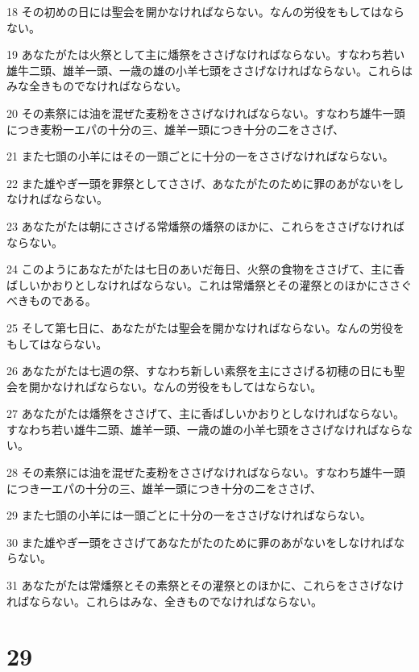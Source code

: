 \par 18 その初めの日には聖会を開かなければならない。なんの労役をもしてはならない。
\par 19 あなたがたは火祭として主に燔祭をささげなければならない。すなわち若い雄牛二頭、雄羊一頭、一歳の雄の小羊七頭をささげなければならない。これらはみな全きものでなければならない。
\par 20 その素祭には油を混ぜた麦粉をささげなければならない。すなわち雄牛一頭につき麦粉一エパの十分の三、雄羊一頭につき十分の二をささげ、
\par 21 また七頭の小羊にはその一頭ごとに十分の一をささげなければならない。
\par 22 また雄やぎ一頭を罪祭としてささげ、あなたがたのために罪のあがないをしなければならない。
\par 23 あなたがたは朝にささげる常燔祭の燔祭のほかに、これらをささげなければならない。
\par 24 このようにあなたがたは七日のあいだ毎日、火祭の食物をささげて、主に香ばしいかおりとしなければならない。これは常燔祭とその灌祭とのほかにささぐべきものである。
\par 25 そして第七日に、あなたがたは聖会を開かなければならない。なんの労役をもしてはならない。
\par 26 あなたがたは七週の祭、すなわち新しい素祭を主にささげる初穂の日にも聖会を開かなければならない。なんの労役をもしてはならない。
\par 27 あなたがたは燔祭をささげて、主に香ばしいかおりとしなければならない。すなわち若い雄牛二頭、雄羊一頭、一歳の雄の小羊七頭をささげなければならない。
\par 28 その素祭には油を混ぜた麦粉をささげなければならない。すなわち雄牛一頭につき一エパの十分の三、雄羊一頭につき十分の二をささげ、
\par 29 また七頭の小羊には一頭ごとに十分の一をささげなければならない。
\par 30 また雄やぎ一頭をささげてあなたがたのために罪のあがないをしなければならない。
\par 31 あなたがたは常燔祭とその素祭とその灌祭とのほかに、これらをささげなければならない。これらはみな、全きものでなければならない。

\chapter{29}

